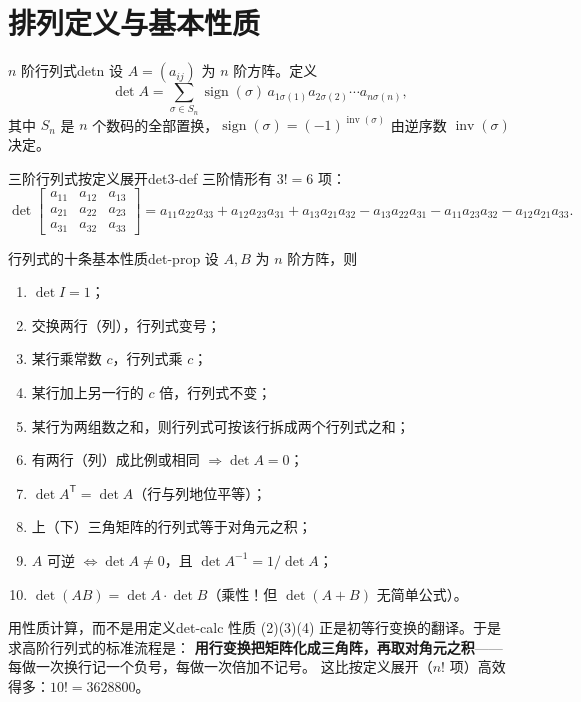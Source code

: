 \documentclass[11pt,a4paper,openany]{ctexbook}
\DeclareMathOperator{\sign}{sign}
\begin{document}
\section{排列定义与基本性质}

\begin{defn}{$n$ 阶行列式}{detn}
设 $A=(a_{ij})$ 为 $n$ 阶方阵。定义
\[
\det A=\sum_{\sigma\in S_n}\sign(\sigma)\,
a_{1\sigma(1)}a_{2\sigma(2)}\cdots a_{n\sigma(n)},
\]
其中 $S_n$ 是 $n$ 个数码的全部置换，$\sign(\sigma)=(-1)^{\operatorname{inv}(\sigma)}$
由逆序数 $\operatorname{inv}(\sigma)$ 决定。
\end{defn}

\begin{exmp}{三阶行列式按定义展开}{det3-def}
三阶情形有 $3!=6$ 项：
\[
\det\begin{bmatrix}a_{11}&a_{12}&a_{13}\\a_{21}&a_{22}&a_{23}\\a_{31}&a_{32}&a_{33}\end{bmatrix}
=a_{11}a_{22}a_{33}+a_{12}a_{23}a_{31}+a_{13}a_{21}a_{32}
-a_{13}a_{22}a_{31}-a_{11}a_{23}a_{32}-a_{12}a_{21}a_{33}.
\]
\end{exmp}

\begin{thm}{行列式的十条基本性质}{det-prop}
设 $A,B$ 为 $n$ 阶方阵，则
\begin{enumerate}[label=(\arabic*), itemsep=1pt]
\item $\det I=1$；
\item 交换两行（列），行列式变号；
\item 某行乘常数 $c$，行列式乘 $c$；
\item 某行加上另一行的 $c$ 倍，行列式不变；
\item 某行为两组数之和，则行列式可按该行拆成两个行列式之和；
\item 有两行（列）成比例或相同 $\Rightarrow\det A=0$；
\item $\det A^{\mathsf T}=\det A$（行与列地位平等）；
\item 上（下）三角矩阵的行列式等于对角元之积；
\item $A$ 可逆 $\Longleftrightarrow \det A\neq 0$，且 $\det A^{-1}=1/\det A$；
\item $\det(AB)=\det A\cdot\det B$（乘性！但 $\det(A+B)$ 无简单公式）。
\end{enumerate}
\end{thm}

\begin{remk}{用性质计算，而不是用定义}{det-calc}
性质 (2)(3)(4) 正是初等行变换的翻译。于是求高阶行列式的标准流程是：
\textbf{用行变换把矩阵化成三角阵，再取对角元之积}——
每做一次换行记一个负号，每做一次倍加不记号。
这比按定义展开（$n!$ 项）高效得多：$10!=3628800$。
\end{remk}
\end{document}
